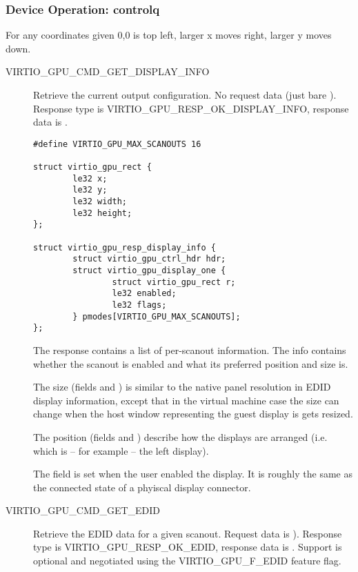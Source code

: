 \subsubsection{Device Operation: controlq}\label{sec:Device Types / GPU Device / Device Operation / Device Operation: controlq}

For any coordinates given 0,0 is top left, larger x moves right,
larger y moves down.

\begin{description}

\item[VIRTIO_GPU_CMD_GET_DISPLAY_INFO] Retrieve the current output
  configuration.  No request data (just bare ).  Response type is
  VIRTIO_GPU_RESP_OK_DISPLAY_INFO, response data is .

\begin{lstlisting}
#define VIRTIO_GPU_MAX_SCANOUTS 16

struct virtio_gpu_rect {
        le32 x;
        le32 y;
        le32 width;
        le32 height;
};

struct virtio_gpu_resp_display_info {
        struct virtio_gpu_ctrl_hdr hdr;
        struct virtio_gpu_display_one {
                struct virtio_gpu_rect r;
                le32 enabled;
                le32 flags;
        } pmodes[VIRTIO_GPU_MAX_SCANOUTS];
};
\end{lstlisting}

The response contains a list of per-scanout information.  The info
contains whether the scanout is enabled and what its preferred
position and size is.

The size (fields  and ) is similar to the
native panel resolution in EDID display information, except that in
the virtual machine case the size can change when the host window
representing the guest display is gets resized.

The position (fields  and ) describe how the
displays are arranged (i.e. which is -- for example -- the left
display).

The  field is set when the user enabled the display.
It is roughly the same as the connected state of a phyiscal display
connector.

\item[VIRTIO_GPU_CMD_GET_EDID] Retrieve the EDID data for a given
  scanout.  Request data is ).
  Response type is VIRTIO_GPU_RESP_OK_EDID, response data is
  .  Support is optional and
  negotiated using the VIRTIO_GPU_F_EDID feature flag.


\end{description}
